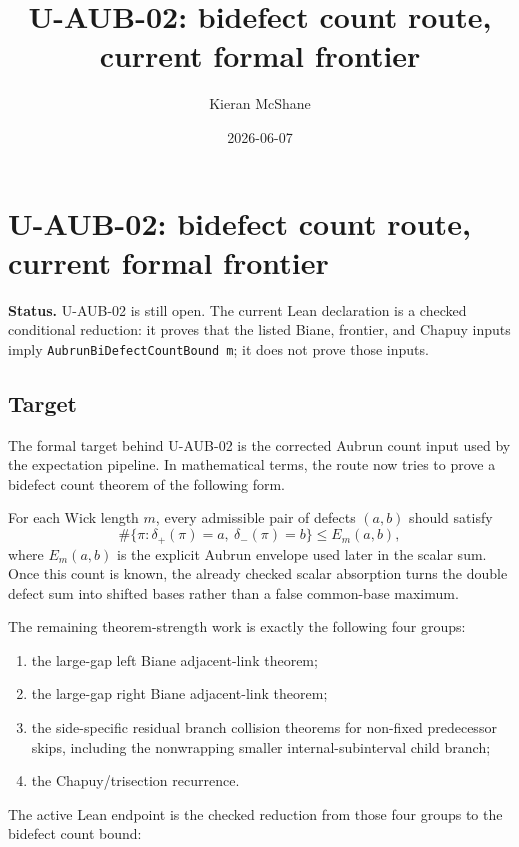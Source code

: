 \documentclass[
]{article}
\title{U-AUB-02: bidefect count route, current formal frontier}
\author{Kieran McShane}
\date{2026-06-07}
\providecommand{\tightlist}{%
  \setlength{\itemsep}{0pt}\setlength{\parskip}{0pt}}
\begin{document}
\maketitle

\section{U-AUB-02: bidefect count route, current formal
frontier}\label{u-aub-02-bidefect-count-route-current-formal-frontier}

\textbf{Status.} U-AUB-02 is still open. The current Lean declaration is
a checked conditional reduction: it proves that the listed Biane,
frontier, and Chapuy inputs imply \texttt{AubrunBiDefectCountBound\ m};
it does not prove those inputs.

\subsection{Target}\label{target}

The formal target behind U-AUB-02 is the corrected Aubrun count input
used by the expectation pipeline. In mathematical terms, the route now
tries to prove a bidefect count theorem of the following form.

For each Wick length \(m\), every admissible pair of defects \((a,b)\)
should satisfy \[
  \#\{\pi : \delta_+(\pi)=a,\ \delta_-(\pi)=b\}
  \le
  E_m(a,b),
\] where \(E_m(a,b)\) is the explicit Aubrun envelope used later in the
scalar sum. Once this count is known, the already checked scalar
absorption turns the double defect sum into shifted bases rather than a
false common-base maximum.

The remaining theorem-strength work is exactly the following four
groups:

\begin{enumerate}
\def\labelenumi{\arabic{enumi}.}
\tightlist
\item
  the large-gap left Biane adjacent-link theorem;
\item
  the large-gap right Biane adjacent-link theorem;
\item
  the side-specific residual branch collision theorems for non-fixed
  predecessor skips, including the nonwrapping smaller
  internal-subinterval child branch;
\item
  the Chapuy/trisection recurrence.
\end{enumerate}

The active Lean endpoint is the checked reduction from those four groups
to the bidefect count bound:
\end{document}
